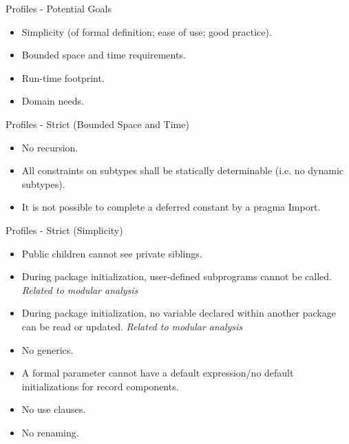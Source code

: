 \documentclass{beamer}
\begin{document}
\begin{frame}{Profiles - Potential Goals}

  \begin{itemize}

  \item Simplicity (of formal definition; ease of use; good practice).
  
  \item Bounded space and time requirements.
  
  \item Run-time footprint.

  \item Domain needs.

  \end{itemize}

\end{frame}

\begin{frame}{Profiles - Strict (Bounded Space and Time)}

  \begin{itemize}

  \item No recursion.
  
  \item All constraints on subtypes shall be statically determinable
        (i.e. no dynamic subtypes).

  \item It is not possible to complete a deferred constant by a pragma Import.

  \end{itemize}
\end{frame}

\begin{frame}{Profiles - Strict (Simplicity)}

  \begin{itemize}

  \item Public children cannot see private siblings.

  \item During package initialization, user-defined subprograms cannot be called.
        \emph{Related to modular analysis}

  \item During package initialization, no variable declared within another package
        can be read or updated. \emph{Related to modular analysis}

  \item No generics.

  \item A formal parameter cannot have a default expression/no
        default initializations for record components.

  \item No use clauses.

  \item No renaming.
  
  \end{itemize}
\end{frame}
\end{document}
